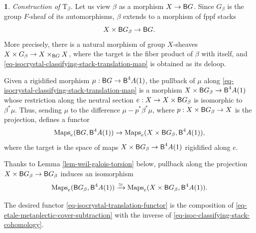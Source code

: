 \documentclass[10pt,english,reqno]{amsart}
\newcommand{\Maps}{\operatorname{Maps}}
\newcommand{\deloop}{\textnormal{\textsf{B}}}
\newcommand{\Translation}{\mathrm{T}}
\theoremstyle{definition}
\numberwithin{equation}{section}
\newtheorem{untitledsubsubsection}[subsubsection]{}
\newenvironment{void}
{\begin{untitledsubsubsection}}
{\end{untitledsubsubsection}}
\begin{document}

\begin{void}\emph{Construction of $\Translation_{\beta}$.}
Let us view $\beta$ as a morphism $X\rightarrow \deloop G$. Since $G_{\beta}$ is the group $F$-sheaf of its automorphisms, $\beta$ extends to a morphism of fppf stacks
\begin{equation}
\label{eq-isocrystal-classifying-stack-translation-map}
X\times \deloop G_{\beta} \rightarrow \deloop G.
\end{equation}
More precisely, there is a natural morphism of group $X$-sheaves $X\times G_{\beta} \rightarrow X\times_{\deloop G}X$, where the target is the fiber product of $\beta$ with itself, and \eqref{eq-isocrystal-classifying-stack-translation-map} is obtained as its deloop.

Given a rigidified morphism $\mu : \deloop G \rightarrow \deloop^4A(1)$, the pullback of $\mu$ along \eqref{eq-isocrystal-classifying-stack-translation-map} is a morphism $X\times\deloop G_{\beta} \rightarrow \deloop^4A(1)$ whose restriction along the neutral section $e : X \rightarrow X\times\deloop G_{\beta}$ is isomorphic to $\beta^*\mu$. Thus, sending $\mu$ to the difference $\mu - p^*\beta^*\mu$, where $p : X\times\deloop G_{\beta} \rightarrow X$ is the projection, defines a functor
\begin{equation}
\label{eq-etale-metaplectic-cover-subtraction}
\Maps_e(\deloop G, \deloop^4A(1)) \rightarrow \Maps_e(X\times \deloop G_{\beta}, \deloop^4A(1)),
\end{equation}
where the target is the space of maps $X\times\deloop G_{\beta} \rightarrow \deloop^4A(1)$ rigidified along $e$.

Thanks to Lemma \ref{lem-weil-galois-torsion} below, pullback along the projection $X\times \deloop G_{\beta} \rightarrow \deloop G_{\beta}$ induces an isomorphism
\begin{equation}
\label{eq-isoc-classifying-stack-cohomology}
\Maps_e(\deloop G_{\beta}, \deloop^4A(1)) \xrightarrow{\simeq} \Maps_e(X\times\deloop G_{\beta}, \deloop^4A(1)).
\end{equation}

The desired functor \eqref{eq-isocrystal-translation-functor} is the composition of \eqref{eq-etale-metaplectic-cover-subtraction} with the inverse of \eqref{eq-isoc-classifying-stack-cohomology}.
\end{void}

\end{document}
